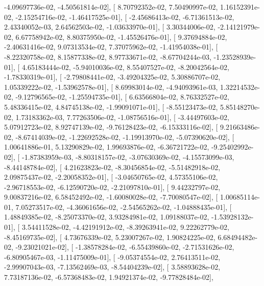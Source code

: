 \documentclass{article}
\begin{document}
         -4.09697736e-02,  -4.50561814e-02],
       [  8.70792352e-02,   7.50490997e-02,   1.16152391e-02,
         -2.15254716e-02,  -1.46417525e-01],
       [ -2.45686413e-02,  -6.71361513e-02,   2.43340052e-03,
          2.64562503e-02,  -1.03633970e-01],
       [  3.30344006e-02,  -2.14121979e-02,   6.67758942e-02,
          8.80375950e-02,  -1.45526476e-01],
       [  9.37694884e-02,  -2.40631416e-02,   9.07313534e-02,
          7.37075962e-02,  -1.41954038e-01],
       [ -8.22320758e-02,   8.15877338e-02,   8.97733671e-02,
         -8.67704244e-03,  -1.23528939e-01],
       [  4.65183444e-02,  -5.94010036e-02,   8.55407527e-02,
         -8.20042564e-02,  -1.78330319e-01],
       [ -2.79808441e-02,  -3.49204325e-02,   5.30886707e-02,
          1.05339222e-02,  -1.53962578e-01],
       [  8.69983014e-02,  -4.94093961e-03,   1.32214532e-02,
         -9.12796565e-02,  -1.25594735e-01],
       [  6.63566804e-02,   8.76332527e-02,   5.48336415e-02,
          4.84745138e-02,  -1.99091071e-01],
       [ -8.55123473e-02,   5.85148270e-02,   1.73183362e-03,
          7.77263506e-02,  -1.08756516e-01],
       [ -3.44497603e-02,   5.07912723e-02,   8.92747139e-02,
         -9.76128423e-02,  -6.15333116e-02],
       [  9.21663486e-02,  -8.67414039e-02,  -1.22692528e-02,
         -1.19913970e-02,  -5.07390620e-02],
       [  1.00641886e-01,   5.13290829e-02,   1.99693876e-02,
         -6.36721722e-02,  -9.25402992e-02],
       [ -1.87383959e-03,  -8.80318157e-02,  -3.07630369e-02,
         -4.15573099e-03,  -8.44148784e-02],
       [  4.21623823e-02,  -8.30456854e-02,  -5.51482918e-02,
          2.09875437e-02,  -2.20058352e-01],
       [ -3.04650765e-02,   4.57355106e-02,  -2.96718553e-02,
         -6.12590720e-02,  -2.21097810e-01],
       [  9.44232797e-02,   9.00837216e-02,   6.58452492e-02,
         -1.60080028e-02,  -7.70080547e-02],
       [  1.00685114e-01,   7.05273517e-02,  -4.36061656e-02,
         -2.54565262e-02,  -1.04888435e-01],
       [  1.48849385e-02,  -8.25073370e-02,   3.93284981e-02,
          1.09188037e-02,  -1.53928132e-01],
       [  3.54411528e-02,  -4.42191912e-02,  -8.39263941e-02,
          9.22262779e-02,  -8.45169735e-02],
       [  4.73676339e-02,   5.23007267e-02,   1.90824225e-02,
          6.68494482e-02,  -9.23021021e-02],
       [ -1.38578284e-02,  -6.55439860e-02,  -2.71531626e-02,
         -6.80905467e-03,  -1.11475009e-01],
       [ -9.05374554e-02,   2.76413511e-02,  -2.99907043e-03,
         -7.13562469e-03,  -8.54404239e-02],
       [  3.58893628e-02,   7.73187136e-02,  -6.57368483e-02,
          1.94921374e-02,  -9.77828484e-02],
\end{document}
